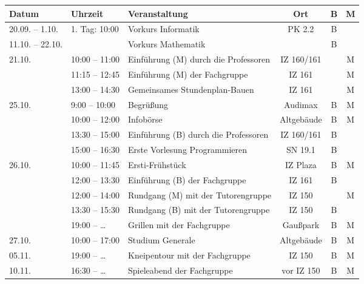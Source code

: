 \begin{figure}[h]
\begin{tabular}{|l|l|p{6.7cm}|c|c|c|}
\hline \textbf{Datum} & \textbf{Uhrzeit} & \textbf{Veranstaltung}	& \textbf{Ort} & \textbf{B} & \textbf{M} \\
\hline 20.09. – 1.10.
				& 1. Tag: 10:00	 & Vorkurs Informatik					& PK 2.2		&B& \\
\hline 11.10. – 22.10. 
				&	 	 		 & Vorkurs Mathematik 					&				&B& \\
\hline 21.10.
				& 10:00 – 11:00	 & Einführung (M) \newline durch die Professoren	& IZ 160/161	& &M\\
\hline 			& 11:15 – 12:45	 & Einführung (M) der Fachgruppe		& IZ 161		& &M\\
\hline 			& 13:00 – 14:30	 & Gemeinsames Stundenplan-Bauen		& IZ 161		& &M\\
\hline 25.10.	&  9:00 – 10:00	 & Begrüßung							& Audimax		&B&M\\
\hline 			& 10:00 – 12:00	 & Infobörse							& Altgebäude	&B&M\\
\hline 			& 13:30 – 15:00	 & Einführung (B) \newline durch die Professoren	& IZ 160/161	&B& \\
\hline 			& 15:00 – 16:30	 & Erste Vorlesung Programmieren		& SN 19.1		&B& \\
\hline 26.10.	& 10:00 – 11:45	 & Ersti-Frühstück						& IZ Plaza		&B&M\\
\hline 			& 12:00 – 13:30	 & Einführung (B) der Fachgruppe		& IZ 161		&B& \\
\hline 			& 12:00 – 14:00	 & Rundgang (M) \newline mit der Tutorengruppe	& IZ 150		& &M\\
\hline 			& 13:30 – 15:30	 & Rundgang (B) \newline mit der Tutorengruppe	& IZ 150		&B& \\
\hline 			& 19:00 – \ldots & Grillen mit der Fachgruppe			& Gaußpark		&B&M\\
\hline 27.10.	& 10:00 – 17:00	 & Studium Generale						& Altgebäude	&B&M\\
\hline 05.11.	& 19:00 – \ldots & Kneipentour mit der Fachgruppe		& IZ 150		&B&M\\
\hline 10.11.	& 16:30 – \ldots & Spieleabend der Fachgruppe			& vor IZ 150	&B&M\\ 
\hline
\end{tabular} 
\end{figure}

\newpage

